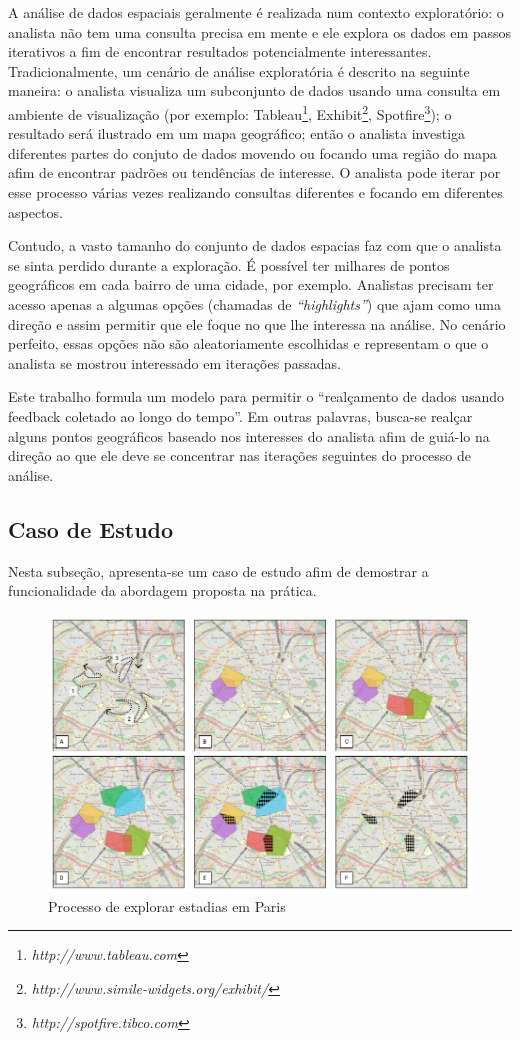 A análise de dados espaciais geralmente é realizada num contexto exploratório: o analista não tem uma consulta precisa em mente e ele explora os dados em passos iterativos a fim de encontrar resultados potencialmente interessantes. Tradicionalmente, um cenário de análise exploratória é descrito na seguinte maneira: o analista visualiza um subconjunto de dados usando uma consulta em ambiente de visualização (por exemplo: Tableau\footnote{\it http://www.tableau.com},
Exhibit\footnote{\it http://www.simile-widgets.org/exhibit/},
Spotfire\footnote{\it http://spotfire.tibco.com}); o resultado será ilustrado em um mapa geográfico; então o analista investiga diferentes partes do conjuto de dados movendo ou focando uma região do mapa afim de encontrar padrões ou tendências de interesse. O analista pode iterar por esse processo várias vezes realizando consultas diferentes e focando em diferentes aspectos.

Contudo, a vasto tamanho do conjunto de dados espacias faz com que o analista se sinta perdido durante a exploração. É possível ter milhares de pontos geográficos em cada bairro de uma cidade, por exemplo. Analistas precisam ter acesso apenas a algumas opções (chamadas de {\em ``highlights''}) que ajam como uma direção e assim permitir que ele foque no que lhe interessa na análise. No cenário perfeito, essas opções não são aleatoriamente escolhidas e representam o que o analista se mostrou interessado em iterações passadas.

Este trabalho formula um modelo para permitir o ``realçamento de dados usando feedback coletado ao longo do tempo''. Em outras palavras, busca-se realçar alguns pontos geográficos baseado nos interesses do analista afim de guiá-lo na direção ao que ele deve se concentrar nas iterações seguintes do processo de análise.

\subsection{Caso de Estudo}

Nesta subseção, apresenta-se um caso de estudo afim de demostrar a funcionalidade da abordagem proposta na prática.

\begin{figure}[t]
	\centering
	\includegraphics[width=\textwidth]{imagens/caso-de-estudo}
	\caption{Processo de explorar estadias em Paris}
	\label{fig:regions}
\end{figure}

